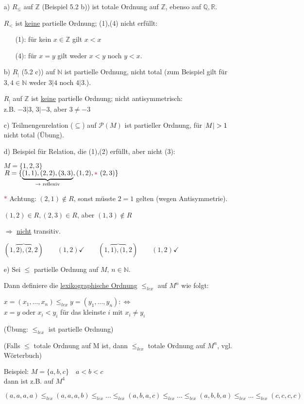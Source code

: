 \documentclass[a4paper, 12pt, twoside] {article}
\let\overfence\overbrace %
\begin{document}
\begin{itemize}
\item[a)]
$R_\leq$ auf $\mathbb{Z}$ (Beispiel 5.2 b)) ist totale Ordnung auf $\mathbb{Z}$, ebenso auf $\mathbb{Q},\mathbb{R}$.

$R_<$ ist \underline{keine} partielle Ordnung; (1),(4) nicht erfüllt:
	
	\begin{itemize}
	\item[(1):] für kein $x \in \mathbb{Z}$ gilt $x < x$
	\item[(4):] für $x=y$ gilt weder $x<y$ noch $y<x$.
	\end{itemize}
	
\item[b)]
$R_|$ (5.2 c)) auf $\mathbb{N}$ ist partielle Ordnung, nicht total (zum Beispiel gilt für $3,4 \in \mathbb{N}$ weder $3|4$ noch $4|3$.).

$R_|$ auf $\mathbb{Z}$ ist \underline{keine} partielle Ordnung; nicht antisymmetrisch: \\
z.B. $-3|3$, $3|-3$, aber $3 \neq -3$

\item[c)] Teilmengenrelation ($\subseteq$) auf $\mathcal{P}(M)$ ist partieller Ordnung, für $\abs{M} > 1 $ nicht total (Übung).

\item[d)] Beispiel für Relation, die (1),(2) erfüllt, aber nicht (3):

$M=\{1,2,3\}$\\
$R = \{\underbrace{(1,1),(2,2),(3,3)}_{\text{$\rightarrow$ reflexiv}},(1,2), \textcolor{red}{*} \text{ } (2,3)\}$

\textcolor{red}{$*$} Achtung: $(2,1) \notin R$, sonst müsste $2=1$ gelten (wegen Antisymmetrie).

$(1,2) \in R, (2,3) \in R$, aber $(1,3) \notin R$

$\Rightarrow$ \underline{nicht} transitiv.

$(1,\overfence{2),(2},2) \qquad (1,2) \checkmark \qquad (1,\overfence{1),(1},2) \qquad (1,2)\checkmark$

\item[e)] Sei $\leq$ partielle Ordnung auf $M$, $n \in \mathbb{N}$.

Dann definiere die \underline{lexikographische Ordnung} $\leq_{lex}$ auf $M^n$ wie folgt:

$x = (x_1,...,x_n) \leq_{lex} y = (y_1,...,y_n) :\Leftrightarrow$ \\
$x = y$ oder $x_i < y_i$ für das kleinste $i$ mit $x_i \neq y_i$

(Übung: $\leq_{lex}$ ist partielle Ordnung)

(Falls $\leq$ totale Ordnung auf M ist, dann $\leq_{lex}$ totale Ordnung auf $M^n$, vgl. Wörterbuch)

Beispiel: $M=\{a,b,c\} \quad a < b < c$ \\
dann ist z.B. auf $M^4$

$(a,a,a,a) \leq_{lex} (a,a,a,b) \leq_{lex} ... \leq_{lex} (a,b,a,c) \leq_{lex} ... \leq_{lex} (a,b,b,a) \leq_{lex} ... \leq_{lex} (c,c,c,c)$
	
\end{itemize}
\end{document}
